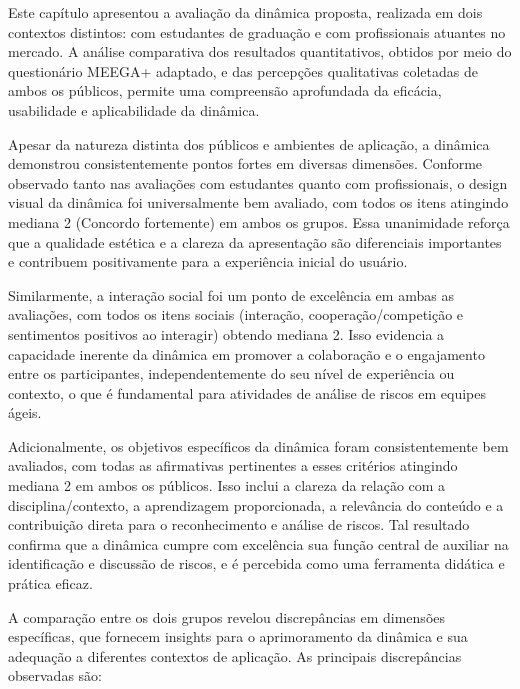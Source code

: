 \documentclass[
	12pt,
	openright,
	twoside,
	a4paper,
	english,
	brazil
	]{abntex2}
\begin{document}
Este capítulo apresentou a avaliação da dinâmica proposta, realizada em dois contextos distintos: com estudantes de graduação e com profissionais atuantes no mercado. A análise comparativa dos resultados quantitativos, obtidos por meio do questionário MEEGA+ adaptado, e das percepções qualitativas coletadas de ambos os públicos, permite uma compreensão aprofundada da eficácia, usabilidade e aplicabilidade da dinâmica.

Apesar da natureza distinta dos públicos e ambientes de aplicação, a dinâmica demonstrou consistentemente pontos fortes em diversas dimensões. Conforme observado tanto nas avaliações com estudantes quanto com profissionais, o design visual da dinâmica foi universalmente bem avaliado, com todos os itens atingindo mediana 2 (Concordo fortemente) em ambos os grupos. Essa unanimidade reforça que a qualidade estética e a clareza da apresentação são diferenciais importantes e contribuem positivamente para a experiência inicial do usuário.

Similarmente, a interação social foi um ponto de excelência em ambas as avaliações, com todos os itens sociais (interação, cooperação/competição e sentimentos positivos ao interagir) obtendo mediana 2. Isso evidencia a capacidade inerente da dinâmica em promover a colaboração e o engajamento entre os participantes, independentemente do seu nível de experiência ou contexto, o que é fundamental para atividades de análise de riscos em equipes ágeis.

Adicionalmente, os objetivos específicos da dinâmica foram consistentemente bem avaliados, com todas as afirmativas pertinentes a esses critérios atingindo mediana 2 em ambos os públicos. Isso inclui a clareza da relação com a disciplina/contexto, a aprendizagem proporcionada, a relevância do conteúdo e a contribuição direta para o reconhecimento e análise de riscos. Tal resultado confirma que a dinâmica cumpre com excelência sua função central de auxiliar na identificação e discussão de riscos, e é percebida como uma ferramenta didática e prática eficaz.

A comparação entre os dois grupos revelou discrepâncias em dimensões específicas, que fornecem insights para o aprimoramento da dinâmica e sua adequação a diferentes contextos de aplicação. As principais discrepâncias observadas são:
\end{document}
